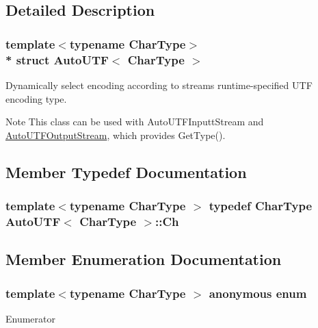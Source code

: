 \subsection{Detailed Description}
\subsubsection*{template$<$typename Char\+Type$>$\\*
struct Auto\+U\+T\+F$<$ Char\+Type $>$}

Dynamically select encoding according to stream\textquotesingle{}s runtime-\/specified U\+TF encoding type. 

\begin{DoxyNote}{Note}
This class can be used with Auto\+U\+T\+F\+Inputt\+Stream and \hyperlink{classAutoUTFOutputStream}{Auto\+U\+T\+F\+Output\+Stream}, which provides Get\+Type(). 
\end{DoxyNote}


\subsection{Member Typedef Documentation}
\subsubsection[{\texorpdfstring{Ch}{Ch}}]{\setlength{\rightskip}{0pt plus 5cm}template$<$typename Char\+Type $>$ typedef Char\+Type {\bf Auto\+U\+TF}$<$ Char\+Type $>$\+::{\bf Ch}}\hypertarget{structAutoUTF_a0609343de776df3bc31b4c980eb3cf1c}{}\label{structAutoUTF_a0609343de776df3bc31b4c980eb3cf1c}


\subsection{Member Enumeration Documentation}
\subsubsection[{\texorpdfstring{anonymous enum}{anonymous enum}}]{\setlength{\rightskip}{0pt plus 5cm}template$<$typename Char\+Type $>$ anonymous enum}\hypertarget{structAutoUTF_a678e20a7f8d022be68adbb49fa56a094}{}\label{structAutoUTF_a678e20a7f8d022be68adbb49fa56a094}
\begin{Desc}
\item[Enumerator]\par
\begin{description}
\item[{\em 
support\+Unicode\hypertarget{structAutoUTF_a678e20a7f8d022be68adbb49fa56a094adc86ae046cd64f591495ac635a5c04c2}{}\label{structAutoUTF_a678e20a7f8d022be68adbb49fa56a094adc86ae046cd64f591495ac635a5c04c2}
}]\end{description}
\end{Desc}


